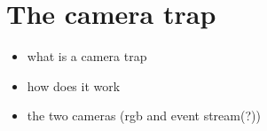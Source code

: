 \section{The camera trap}

\begin{itemize}
	\item what is a camera trap
	\item how does it work
	\item the two cameras (rgb and event stream(?))
\end{itemize}
